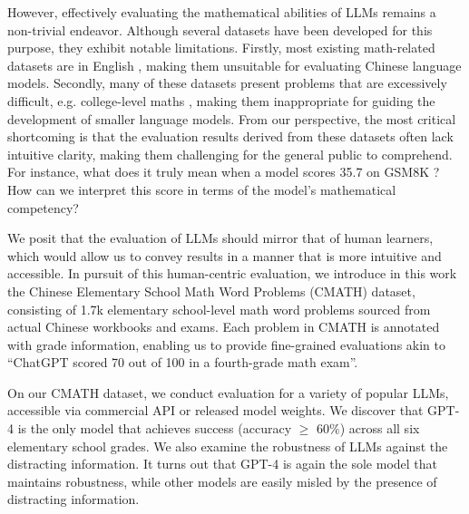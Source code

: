 However, effectively evaluating the mathematical abilities of LLMs remains a non-trivial endeavor. Although several datasets have been developed for this purpose, they exhibit notable limitations. Firstly, most existing math-related datasets are in English \citep{gsm8k, mathqa, math}, making them unsuitable for evaluating Chinese language models. Secondly, many of these datasets present problems that are excessively difficult, e.g. college-level maths \citep{math, mmlu}, making them inappropriate for guiding the development of smaller language models. From our perspective, the most critical shortcoming is that the evaluation results derived from these datasets often lack intuitive clarity, making them challenging for the general public to comprehend. For instance, what does it truly mean when a model scores 35.7 on GSM8K \citep{gsm8k}? How can we interpret this score in terms of the model's mathematical competency?

We posit that the evaluation of LLMs should mirror that of human learners, which would allow us to convey results in a manner that is more intuitive and accessible. In pursuit of this human-centric evaluation, we introduce in this work the Chinese Elementary School Math Word Problems (CMATH) dataset, consisting of 1.7k elementary school-level math word problems sourced from actual Chinese workbooks and exams. Each problem in CMATH is annotated with grade information, enabling us to provide fine-grained evaluations akin to ``ChatGPT scored 70 out of 100 in a fourth-grade math exam''.

On our CMATH dataset, we conduct evaluation for a variety of popular LLMs, accessible via commercial API or released model weights. We discover that  GPT-4 is the only model that achieves success (accuracy $\geq$ 60\%) across all six elementary school grades. We also examine the robustness of LLMs against the distracting information. It turns out that GPT-4 is again the sole model that maintains robustness, while other models are easily misled by the presence of distracting information.

